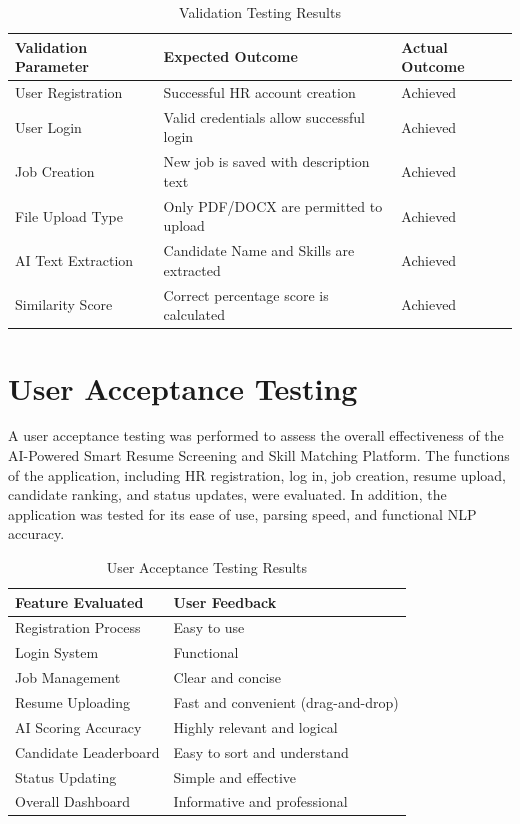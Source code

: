 \documentclass[12pt,a4paper]{report}
\begin{document}
\begin{table}[H]
\centering
\renewcommand{\arraystretch}{1.4}
\begin{tabular}{|p{4cm}|p{5cm}|p{3cm}|}
\hline
\textbf{Validation Parameter} & \textbf{Expected Outcome} & \textbf{Actual Outcome} \\ \hline
User Registration & Successful HR account creation & Achieved \\ \hline
User Login & Valid credentials allow successful login & Achieved \\ \hline
Job Creation & New job is saved with description text & Achieved \\ \hline
File Upload Type & Only PDF/DOCX are permitted to upload & Achieved \\ \hline
AI Text Extraction & Candidate Name and Skills are extracted & Achieved \\ \hline
Similarity Score & Correct percentage score is calculated & Achieved \\ \hline
\end{tabular}
\caption{Validation Testing Results}
\end{table}
\section{User Acceptance Testing}

A user acceptance testing was performed to assess the overall effectiveness of the AI-Powered Smart Resume Screening and Skill Matching Platform. The functions of the application, including HR registration, log in, job creation, resume upload, candidate ranking, and status updates, were evaluated. In addition, the application was tested for its ease of use, parsing speed, and functional NLP accuracy.

\begin{table}[H]
\centering
\renewcommand{\arraystretch}{1.4}
\begin{tabular}{|p{4cm}|p{7cm}|}
\hline
\textbf{Feature Evaluated} & \textbf{User Feedback} \\ \hline
Registration Process & Easy to use \\ \hline
Login System & Functional \\ \hline
Job Management & Clear and concise \\ \hline
Resume Uploading & Fast and convenient (drag-and-drop) \\ \hline
AI Scoring Accuracy & Highly relevant and logical \\ \hline
Candidate Leaderboard & Easy to sort and understand \\ \hline
Status Updating & Simple and effective \\ \hline
Overall Dashboard & Informative and professional \\ \hline
\end{tabular}
\caption{User Acceptance Testing Results}
\end{table}
\end{document}
